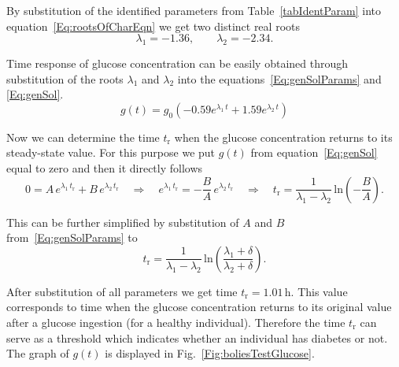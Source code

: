 \documentclass{article}
\providecommand{\m}[1]{\ensuremath{\mathrm{#1}}}
\begin{document}
By substitution of the identified parameters from Table~\ref{tabIdentParam} into equation~\eqref{Eq:rootsOfCharEqn} we get two distinct real roots
\begin{equation*}
	\lambda_1 = -1.36, \qquad 	\lambda_2 = -2.34.
\end{equation*}

Time response of glucose concentration can be easily obtained through substitution of the roots $\lambda_1$ and $\lambda_2$ into the equations~\eqref{Eq:genSolParams} and \eqref{Eq:genSol}.
\begin{equation}
	g(t) = g_0 \left( -0.59 e^{\lambda_1\,t} + 1.59 e^{\lambda_2\,t} \right)
\end{equation}

Now we can determine the time $t_\m{r}$ when the glucose concentration returns to its steady-state value. For this purpose we put $g(t)$ from equation~\eqref{Eq:genSol} equal to zero and then it directly follows
\begin{equation*}
	0 = A\,e^{\lambda_1 \, t_\m{r}} + B\,e^{\lambda_2 \, t_\m{r}}		\quad\Rightarrow\quad
	e^{\lambda_1\,t_\m{r}} = -\frac{B}{A}\,e^{\lambda_2\,t_\m{r}} 	\quad\Rightarrow\quad
	t_\m{r} = \frac{1}{\lambda_1 - \lambda_2}\,\m{ln}\left(-\frac{B}{A}\right).
\end{equation*}


This can be further simplified by substitution of $A$ and $B$ from~\eqref{Eq:genSolParams} to
\begin{equation}
	t_\m{r} = \frac{1}{\lambda_1 - \lambda_2}\,\m{ln}\left(\frac{\lambda_1+\delta}{\lambda_2+\delta}\right).
\end{equation}

After substitution of all parameters we get time $t_\m{r}=1.01\,\si{\hour}$. This value corresponds to time when the glucose concentration returns to its original value after a glucose ingestion (for a healthy individual). Therefore the time $t_\m{r}$ can serve as a threshold which indicates whether an individual has diabetes or not. The graph of $g(t)$ is displayed in Fig.~\ref{Fig:boliesTestGlucose}.
\end{document}
